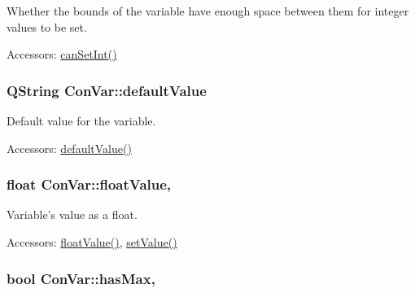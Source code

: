 Whether the bounds of the variable have enough space between them for integer values to be set. 

\begin{DoxyParagraph}{Accessors\-:}
\hyperlink{class_con_var_a9fe17f8e6afc6b9fa6b69136b51b070f}{can\-Set\-Int()} 
\end{DoxyParagraph}
\hypertarget{class_con_var_a6c9dacfaf9130a2d3f971f8b67af3dfc}{
\subsubsection[{default\-Value}]{\setlength{\rightskip}{0pt plus 5cm}Q\-String Con\-Var\-::default\-Value\hspace{0.3cm}{\ttfamily [read]}}}\label{class_con_var_a6c9dacfaf9130a2d3f971f8b67af3dfc}


Default value for the variable. 

\begin{DoxyParagraph}{Accessors\-:}
\hyperlink{class_con_var_a6c9dacfaf9130a2d3f971f8b67af3dfc}{default\-Value()} 
\end{DoxyParagraph}
\hypertarget{class_con_var_a5f274e561a3ee35dd2d67341be4def6f}{
\subsubsection[{float\-Value}]{\setlength{\rightskip}{0pt plus 5cm}float Con\-Var\-::float\-Value\hspace{0.3cm}{\ttfamily [read]}, {\ttfamily [write]}}}\label{class_con_var_a5f274e561a3ee35dd2d67341be4def6f}


Variable's value as a float. 

\begin{DoxyParagraph}{Accessors\-:}
\hyperlink{class_con_var_a5f274e561a3ee35dd2d67341be4def6f}{float\-Value()}, \hyperlink{class_con_var_a855c6e0548e43aaa8876e90581a5e5f3}{set\-Value()} 
\end{DoxyParagraph}
\hypertarget{class_con_var_ab8a0883ab2a53b5ef20ea5673636ac01}{
\subsubsection[{has\-Max}]{\setlength{\rightskip}{0pt plus 5cm}bool Con\-Var\-::has\-Max\hspace{0.3cm}{\ttfamily [read]}, {\ttfamily [write]}}}\label{class_con_var_ab8a0883ab2a53b5ef20ea5673636ac01}



